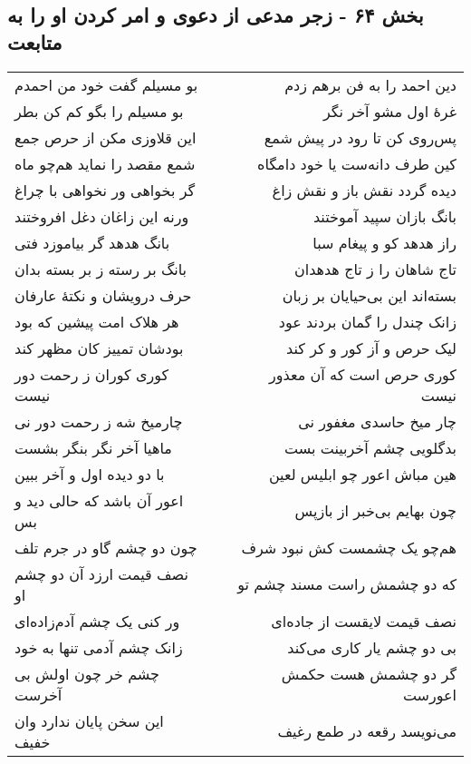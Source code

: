 \begin{center}
\section*{بخش ۶۴ - زجر مدعی از دعوی و امر کردن او را به متابعت}
\label{sec:sh064}
\begin{longtable}{l p{0.5cm} r}
بو مسیلم گفت خود من احمدم
&&
دین احمد را به فن برهم زدم
\\
بو مسیلم را بگو کم کن بطر
&&
غرهٔ اول مشو آخر نگر
\\
این قلاوزی مکن از حرص جمع
&&
پس‌روی کن تا رود در پیش شمع
\\
شمع مقصد را نماید هم‌چو ماه
&&
کین طرف دانه‌ست یا خود دامگاه
\\
گر بخواهی ور نخواهی با چراغ
&&
دیده گردد نقش باز و نقش زاغ
\\
ورنه این زاغان دغل افروختند
&&
بانگ بازان سپید آموختند
\\
بانگ هدهد گر بیاموزد فتی
&&
راز هدهد کو و پیغام سبا
\\
بانگ بر رسته ز بر بسته بدان
&&
تاج شاهان را ز تاج هدهدان
\\
حرف درویشان و نکتهٔ عارفان
&&
بسته‌اند این بی‌حیایان بر زبان
\\
هر هلاک امت پیشین که بود
&&
زانک چندل را گمان بردند عود
\\
بودشان تمییز کان مظهر کند
&&
لیک حرص و آز کور و کر کند
\\
کوری کوران ز رحمت دور نیست
&&
کوری حرص است که آن معذور نیست
\\
چارمیخ شه ز رحمت دور نی
&&
چار میخ حاسدی مغفور نی
\\
ماهیا آخر نگر بنگر بشست
&&
بدگلویی چشم آخربینت بست
\\
با دو دیده اول و آخر ببین
&&
هین مباش اعور چو ابلیس لعین
\\
اعور آن باشد که حالی دید و بس
&&
چون بهایم بی‌خبر از بازپس
\\
چون دو چشم گاو در جرم تلف
&&
هم‌چو یک چشمست کش نبود شرف
\\
نصف قیمت ارزد آن دو چشم او
&&
که دو چشمش راست مسند چشم تو
\\
ور کنی یک چشم آدم‌زاده‌ای
&&
نصف قیمت لایقست از جاده‌ای
\\
زانک چشم آدمی تنها به خود
&&
بی دو چشم یار کاری می‌کند
\\
چشم خر چون اولش بی آخرست
&&
گر دو چشمش هست حکمش اعورست
\\
این سخن پایان ندارد وان خفیف
&&
می‌نویسد رقعه در طمع رغیف
\\
\end{longtable}
\end{center}
